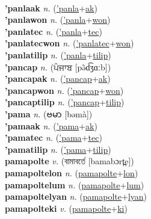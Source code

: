  \label{'panla} \\
\textbf{'panlaak} \textit{n.} (\hyperref['panla]{'panla}+\hyperref[ak]{ak})
 \label{'panlaak} \\
\textbf{'panlawon} \textit{n.} (\hyperref['panla]{'panla}+\hyperref[won]{won})
 \label{'panlawon} \\
\textbf{'panlatec} \textit{n.} (\hyperref['panla]{'panla}+\hyperref[tec]{tec})
 \label{'panlatec} \\
\textbf{'panlatecwon} \textit{n.} (\hyperref['panlatec]{'panlatec}+\hyperref[won]{won})
 \label{'panlatecwon} \\
\textbf{'panlatilip} \textit{n.} (\hyperref['panla]{'panla}+\hyperref[tilip]{tilip})
 \label{'panlatilip} \\
\textbf{'pancap} \textit{n.} ({\gurmukhi{}ਪੰਜਾਬ} [pə̃d͡ʒɑːb])
 \label{'pancap} \\
\textbf{'pancapak} \textit{n.} (\hyperref['pancap]{'pancap}+\hyperref[ak]{ak})
 \label{'pancapak} \\
\textbf{'pancapwon} \textit{n.} (\hyperref['pancap]{'pancap}+\hyperref[won]{won})
 \label{'pancapwon} \\
\textbf{'pancaptilip} \textit{n.} (\hyperref['pancap]{'pancap}+\hyperref[tilip]{tilip})
 \label{'pancaptilip} \\
\textbf{'pama} \textit{n.} ({\myanmar{}ဗမာ} [bəmà])
 \label{'pama} \\
\textbf{'pamaak} \textit{n.} (\hyperref['pama]{'pama}+\hyperref[ak]{ak})
 \label{'pamaak} \\
\textbf{'pamatec} \textit{n.} (\hyperref['pama]{'pama}+\hyperref[tec]{tec})
 \label{'pamatec} \\
\textbf{'pamatilip} \textit{n.} (\hyperref['pama]{'pama}+\hyperref[tilip]{tilip})
 \label{'pamatilip} \\
\textbf{pamapolte} \textit{v.} ({\bengali{}বামাবর্তে} [bamabɔrt̪e])
 \label{pamapolte} \\
\textbf{pamapoltelon} \textit{n.} (\hyperref[pamapolte]{pamapolte}+\hyperref[lon]{lon})
 \label{pamapoltelon} \\
\textbf{pamapoltelum} \textit{n.} (\hyperref[pamapolte]{pamapolte}+\hyperref[lum]{lum})
 \label{pamapoltelum} \\
\textbf{pamapoltelyan} \textit{n.} (\hyperref[pamapolte]{pamapolte}+\hyperref[lyan]{lyan})
 \label{pamapoltelyan} \\
\textbf{pamapolteki} \textit{v.} (\hyperref[pamapolte]{pamapolte}+\hyperref[ki]{ki})
 \label{pamapolteki} \\
